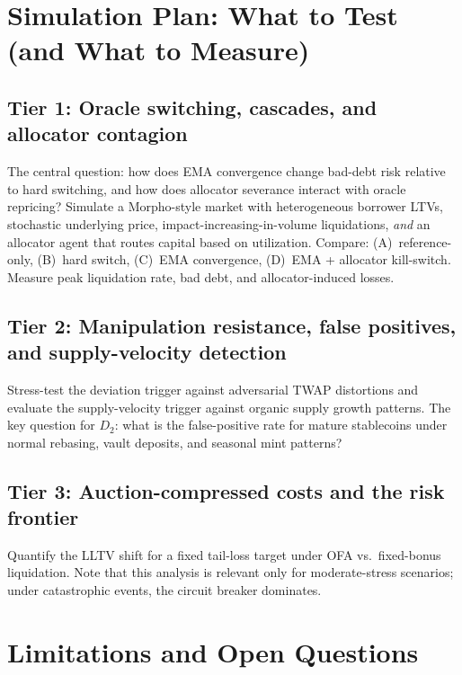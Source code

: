 \documentclass[11pt]{article}
\begin{document}
\section{Simulation Plan: What to Test (and What to Measure)}
\label{sec:sim_plan}

\subsection*{Tier 1: Oracle switching, cascades, and allocator contagion}

The central question: how does EMA convergence change bad-debt risk relative to hard switching, and how does allocator severance interact with oracle repricing? Simulate a Morpho-style market with heterogeneous borrower LTVs, stochastic underlying price, impact-increasing-in-volume liquidations, \emph{and} an allocator agent that routes capital based on utilization. Compare: (A)~reference-only, (B)~hard switch, (C)~EMA convergence, (D)~EMA + allocator kill-switch. Measure peak liquidation rate, bad debt, and allocator-induced losses.

\subsection*{Tier 2: Manipulation resistance, false positives, and supply-velocity detection}

Stress-test the deviation trigger against adversarial TWAP distortions and evaluate the supply-velocity trigger against organic supply growth patterns. The key question for $D_2$: what is the false-positive rate for mature stablecoins under normal rebasing, vault deposits, and seasonal mint patterns?

\subsection*{Tier 3: Auction-compressed costs and the risk frontier}

Quantify the LLTV shift for a fixed tail-loss target under OFA vs.\ fixed-bonus liquidation. Note that this analysis is relevant only for moderate-stress scenarios; under catastrophic events, the circuit breaker dominates.

\section{Limitations and Open Questions}
\end{document}
